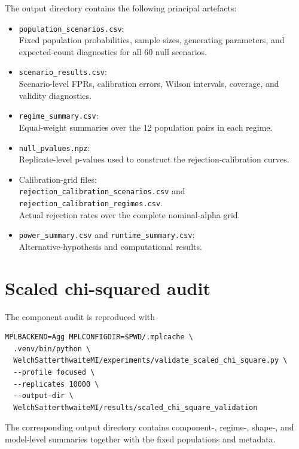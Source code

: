 The output directory contains the following principal artefacts:
\begin{itemize}[leftmargin=*]
  \item \texttt{population\_scenarios.csv}:\\
  Fixed population probabilities, sample sizes, generating parameters, and
  expected-count diagnostics for all 60 null scenarios.

  \item \texttt{scenario\_results.csv}:\\
  Scenario-level FPRs, calibration errors, Wilson intervals, coverage, and
  validity diagnostics.

  \item \texttt{regime\_summary.csv}:\\
  Equal-weight summaries over the 12 population pairs in each regime.

  \item \texttt{null\_pvalues.npz}:\\
  Replicate-level p-values used to construct the rejection-calibration curves.

  \item Calibration-grid files:\\
  \texttt{rejection\_calibration\_scenarios.csv} and\\
  \texttt{rejection\_calibration\_regimes.csv}.\\
  Actual rejection rates over the complete nominal-alpha grid.

  \item \texttt{power\_summary.csv} and \texttt{runtime\_summary.csv}:\\
  Alternative-hypothesis and computational results.
\end{itemize}

\section{Scaled chi-squared audit}

The component audit is reproduced with
\begin{verbatim}
MPLBACKEND=Agg MPLCONFIGDIR=$PWD/.mplcache \
  .venv/bin/python \
  WelchSatterthwaiteMI/experiments/validate_scaled_chi_square.py \
  --profile focused \
  --replicates 10000 \
  --output-dir \
  WelchSatterthwaiteMI/results/scaled_chi_square_validation
\end{verbatim}
The corresponding output directory contains component-, regime-, shape-, and
model-level summaries together with the fixed populations and metadata.

